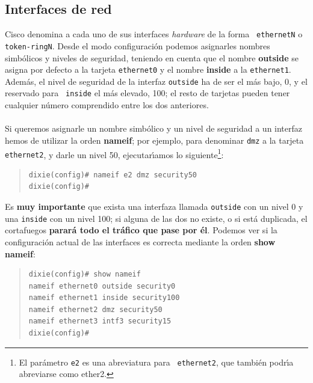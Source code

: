 \subsection{Interfaces de red}
Cisco denomina a cada uno de sus interfaces {\it hardware} de la forma {\tt 
ethernetN} o {\tt token-ringN}. Desde el modo configuraci\'on podemos 
asignarles nombres simb\'olicos y niveles de seguridad, teniendo en cuenta que 
el nombre {\bf outside} se asigna por defecto a la tarjeta {\tt ethernet0} y el 
nombre {\bf inside} a la {\tt ethernet1}. Adem\'as, el nivel de seguridad de la 
interfaz {\tt outside} ha de ser el m\'as bajo, 0, y el reservado para {\tt 
inside} el m\'as elevado, 100; el resto de tarjetas pueden tener cualquier 
n\'umero comprendido entre los dos anteriores.\\
\\Si queremos asignarle un nombre simb\'olico y un nivel de seguridad a un 
interfaz hemos de utilizar la orden {\bf nameif}; por ejemplo, para denominar 
{\tt dmz} a la tarjeta {\tt ethernet2}, y darle un nivel 50, ejecutar\'{\i}amos 
lo siguiente\footnote{El par\'ametro {\tt e2} es una abreviatura para {\tt 
ethernet2}, que tambi\'en podr\'{\i}a abreviarse como ether2.}:
\begin{quote}
\begin{verbatim}
dixie(config)# nameif e2 dmz security50
dixie(config)# 
\end{verbatim}
\end{quote}
Es {\bf muy importante} que exista una interfaza llamada {\tt outside} con un 
nivel 0 y una {\tt inside} con un nivel 100; si alguna de las dos no existe, o 
si est\'a duplicada, el cortafuegos {\bf parar\'a todo el tr\'afico que pase 
por \'el}. Podemos ver si la configuraci\'on actual de las interfaces es 
correcta mediante la orden {\bf show nameif}:
\begin{quote}
\begin{verbatim}
dixie(config)# show nameif
nameif ethernet0 outside security0
nameif ethernet1 inside security100
nameif ethernet2 dmz security50
nameif ethernet3 intf3 security15
dixie(config)# 
\end{verbatim}
\end{quote}
